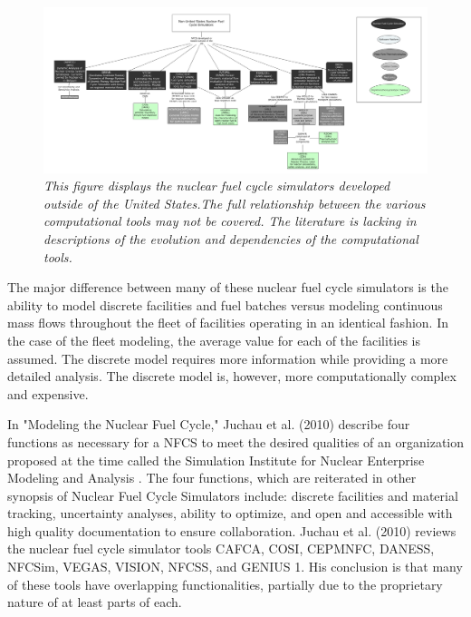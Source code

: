 \documentclass{article}                                                                           %
\begin{document}
\begin{linenumbers}
\begin{subfigures}
\begin{figure}
\includegraphics[width=\textwidth]{Non-US_FUEL_TOOLS.png}
\caption{\small \sl This figure displays the nuclear fuel cycle simulators developed outside of the United States.The full relationship between the various computational tools may not be covered.  The literature is lacking in descriptions of the evolution and dependencies of the computational tools.}
\end{figure}
\end{subfigures}

The major difference between many of these nuclear fuel cycle simulators is the ability to model discrete facilities and fuel batches versus modeling continuous mass flows throughout the fleet of facilities operating in an identical fashion. In the case of the fleet modeling, the average value for each of the facilities is assumed. The discrete model requires more information while providing a more detailed analysis. The discrete model is, however, more computationally complex and expensive.

In "Modeling the Nuclear Fuel Cycle," Juchau et al. (2010) describe four functions as necessary for a NFCS to meet the desired qualities of an organization proposed at the time called the Simulation Institute for Nuclear Enterprise Modeling and Analysis \cite{Juchau2010}. The four functions, which are reiterated in other synopsis of Nuclear Fuel Cycle Simulators \cite{Wilson} include: discrete facilities and material tracking, uncertainty analyses, ability to optimize, and open and accessible with high quality documentation to ensure collaboration. Juchau et al. (2010) reviews the nuclear fuel cycle simulator tools CAFCA, COSI, CEPMNFC, DANESS, NFCSim, VEGAS, VISION, NFCSS, and GENIUS 1. His conclusion is that many of these tools have overlapping functionalities, partially due to the proprietary nature of at least parts of each.


\end{linenumbers}
\end{document}
